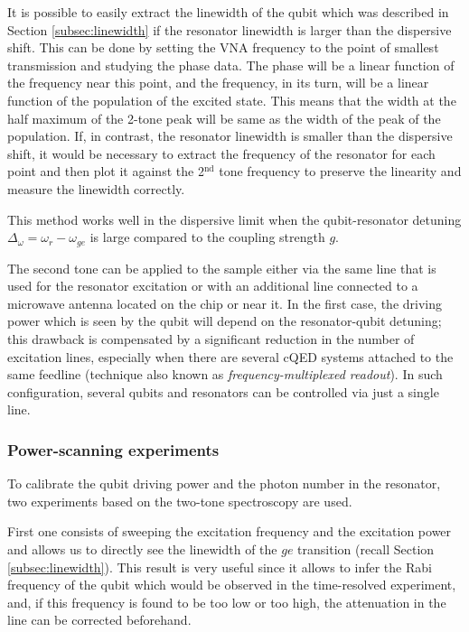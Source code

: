 It is possible to easily extract the linewidth of the qubit which was described in Section \ref{subsec:linewidth} if the resonator linewidth is larger than the dispersive shift. This can be done by setting the VNA frequency to the point of smallest transmission and studying the phase data. The phase will be a linear function of the frequency near this point, and the frequency, in its turn, will be a linear function of the population of the excited state. This means that the width at the half maximum of the 2-tone peak will be same as the width of the peak of the population. If, in contrast, the resonator linewidth is smaller than the dispersive shift, it would be necessary to extract the frequency of the resonator for each point and then plot it against the 2$^{\text{nd}}$ tone frequency to preserve the linearity and measure the linewidth correctly.

This method works well in the dispersive limit when the qubit-resonator detuning $\Delta_\omega = \omega_r - \omega_{ge}$ is large compared to the coupling strength $g$.

The second tone can be applied to the sample either via the same line that is used for the resonator excitation or with an additional line connected to a microwave antenna located on the chip or near it. In the first case, the driving power which is seen by the qubit will depend on the resonator-qubit detuning; this drawback is compensated by a significant reduction in the number of excitation lines, especially when there are several cQED systems attached to the same feedline (technique also known as \textit{frequency-multiplexed readout}). In such configuration, several qubits and resonators can be controlled via just a single line.

\subsubsection{Power-scanning experiments}

To calibrate the qubit driving power and the photon number in the resonator, two experiments based on the two-tone spectroscopy are used\cite{schuster2005}. 

First one consists of sweeping the excitation frequency and the excitation power and allows us to directly see the linewidth of the $ge$ transition (recall Section \ref{subsec:linewidth}). This result is very useful since it allows to infer the Rabi frequency of the qubit which would be observed in the time-resolved experiment, and, if this frequency is found to be too low or too high, the attenuation in the line can be corrected beforehand.

